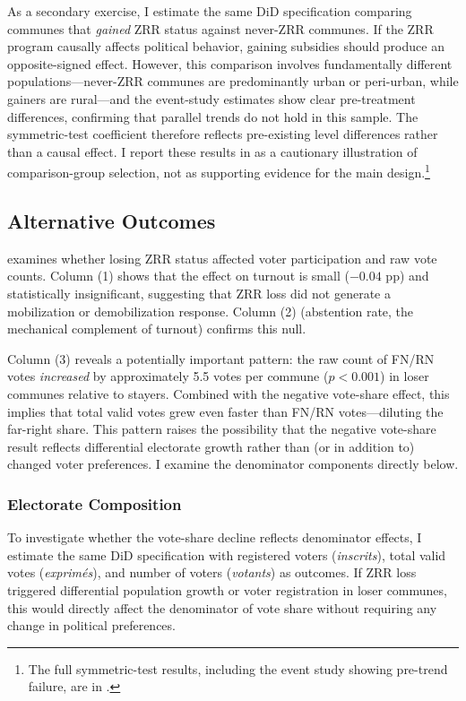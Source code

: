 \documentclass[12pt]{article}
\begin{document}
As a secondary exercise, I estimate the same DiD specification comparing communes that \textit{gained} ZRR status against never-ZRR communes. If the ZRR program causally affects political behavior, gaining subsidies should produce an opposite-signed effect. However, this comparison involves fundamentally different populations---never-ZRR communes are predominantly urban or peri-urban, while gainers are rural---and the event-study estimates show clear pre-treatment differences, confirming that parallel trends do not hold in this sample. The symmetric-test coefficient therefore reflects pre-existing level differences rather than a causal effect. I report these results in  as a cautionary illustration of comparison-group selection, not as supporting evidence for the main design.\footnote{The full symmetric-test results, including the event study showing pre-trend failure, are in .}

\subsection{Alternative Outcomes}

 examines whether losing ZRR status affected voter participation and raw vote counts. Column (1) shows that the effect on turnout is small ($-0.04$ pp) and statistically insignificant, suggesting that ZRR loss did not generate a mobilization or demobilization response. Column (2) (abstention rate, the mechanical complement of turnout) confirms this null.

Column (3) reveals a potentially important pattern: the raw count of FN/RN votes \textit{increased} by approximately 5.5 votes per commune ($p < 0.001$) in loser communes relative to stayers. Combined with the negative vote-share effect, this implies that total valid votes grew even faster than FN/RN votes---diluting the far-right share. This pattern raises the possibility that the negative vote-share result reflects differential electorate growth rather than (or in addition to) changed voter preferences. I examine the denominator components directly below.

\subsubsection{Electorate Composition}

To investigate whether the vote-share decline reflects denominator effects, I estimate the same DiD specification with registered voters (\textit{inscrits}), total valid votes (\textit{exprim\'{e}s}), and number of voters (\textit{votants}) as outcomes. If ZRR loss triggered differential population growth or voter registration in loser communes, this would directly affect the denominator of vote share without requiring any change in political preferences.
\end{document}
